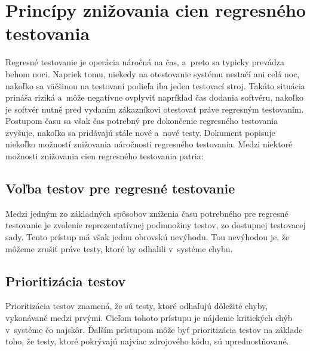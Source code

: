 \section{Princípy znižovania cien regresného testovania}
\label{sekcia:principy_znizovania_cien}
Regresné testovanie je operácia náročná na čas, a~preto sa typicky prevádza behom noci.
Napriek tomu, niekedy na otestovanie systému nestačí ani celá noc, nakoľko sa väčšinou na testovaní
podieľa iba jeden testovací stroj. Takáto situácia prináša riziká a~môže negatívne ovplyviť 
napríklad čas dodania softvéru, nakoľko je softvér nutné pred vydaním zákazníkovi otestovať práve
regresným testovaním. Postupom času sa však čas potrebný pre dokončenie regresného testovania zvyšuje,
nakoľko sa pridávajú stále nové a~nové testy. Dokument \cite{Parallel_approach} popisuje niekoľko možností znižovania náročnosti
regresného testovania.
Medzi niektoré možnosti znižovania cien regresného testovania patria:

\subsection*{Voľba testov pre regresné testovanie}
Medzi jedným zo základných spôsobov zníženia času potrebného pre regresné testovanie je zvolenie reprezentatívnej
podmnožiny testov, zo dostupnej testovacej sady. Tento prístup má však jednu obrovskú nevýhodu. 
Tou nevýhodou je, že môžeme zrušiť práve testy, ktoré by odhalili v~systéme chybu. 

\subsection*{Prioritizácia testov}
Prioritizácia testov znamená, že sú testy, ktoré odhaľujú dôležité chyby, vykonávané medzi prvými.
Cieľom tohoto prístupu je nájdenie kritických chýb v~systéme čo najskôr. 
Ďalším prístupom môže byť prioritizácia testov na základe toho, že testy, ktoré pokrývajú najviac zdrojového kódu,
sú uprednostňované.


